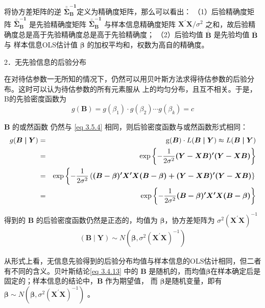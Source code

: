		 将协方差矩阵的逆 $ \boldsymbol{\bar{\bar{\Sigma}}_{B}^{-1}} $定义为精确度矩阵，那么可以看出：
		 （1）后验精确度矩阵
		 $ \boldsymbol{\bar{\bar{\Sigma}}_{B}^{-1}} $
		  是先验精确度矩阵 $ \boldsymbol{\bar{\bar{\Sigma}}_{B}^{-1}} $ 与样本信息精确度矩阵
		   $ \boldsymbol{X^{\prime} \mathbf{X} } / \sigma^{2} $ 之和，故后验精确度总是高于先验精确度总是高于先验精确度；
		   （2）后验均值  $\boldsymbol{ \overline{\overline{B}}}$ 是先验均值 $\boldsymbol{ {\overline{B}}} $与
		   样本信息OLS估计值 $ \boldsymbol{\beta} $ 的加权平均和，权数为高自的精确度。
		  
		  2．无先验信息的后验分布
		  
		  在对待估参数一无所知的情况下，仍然可以用贝叶斯方法求得待估参数的后验分布。这时可以认为待估参数的所有元素服从 上的均匀分布，且互不相关。于是，B的先验密度函数为
		  $$ g(\boldsymbol{B})=g\left(\beta_{1}\right) \cdot g\left(\beta_{2}\right) \cdots g\left(\beta_{k}\right) = c $$
		  
		  $ \boldsymbol{B} $ 的或然函数 仍然与 \eqref{eq 3.5.4} 相同，则后验密度函数与或然函数形式相同：
		  \begin{eqnarray}
		  g(\boldsymbol{B \mid Y}) & = & \operatorname{g}(\boldsymbol{B}) \cdot L(\boldsymbol{B \mid Y}) \approx  L(\boldsymbol{B \mid Y}) \notag  \\
		  & =  & \exp \left\{-\frac{1}{2 \sigma^{2}}\boldsymbol{(Y-X B)^{\prime}(Y-X B)}\right\}  \notag \\
		  & =  & \exp \left\{-\frac{1}{2 \sigma^{2}}\left(\boldsymbol{(B-\beta)^{\prime} X^{\prime} X(B-\beta)+(Y-X B)^{\prime}(Y-X B)} \right\}\right. 
		  \label{eq 3.4.12}\\
		  & =  & \exp \left\{-\frac{1}{2 \sigma^{2}}\boldsymbol{(B-\beta)^{\prime} X^{\prime} X(B-\beta)} \right\} \notag 
		  \end{eqnarray}
		  
		  得到的 $ \boldsymbol{B} $ 的后验密度函数仍然是正态的，均值为 $ \boldsymbol{\beta} $，协方差矩阵为 
		  $ \sigma^{2} \left(\boldsymbol{X}^{\prime} \boldsymbol{X}\right)^{-1} $
		  \begin{eqnarray}
			(\boldsymbol{B \mid Y}) \sim N\left(\boldsymbol{\beta}, \sigma^{2}\left(\boldsymbol{X}^{\prime} \boldsymbol{X}\right)^{-1}\right)
			\label{eq 3.4.13}
		  \end{eqnarray}
		  
		  从形式上看，无信息先验得到的后验分布均值与样本信息的OLS估计相同，但二者有不同的含义。贝叶斯结论\ref{eq 3.4.13}
		 中的 $ \boldsymbol{B} $ 是随机的，而均值$ \boldsymbol{\beta} $在样本确定后是固定的；样本信息的结论中，$ \boldsymbol{B} $ 作为期望值，
		 而 $ \boldsymbol{\beta}  $是随机变量，即有
		  $ \boldsymbol{\beta} \sim N \left(\boldsymbol{\beta}, \sigma^{2}\left(\boldsymbol{X^{\prime} X}\right)^{-1}\right) $ 。
		  
